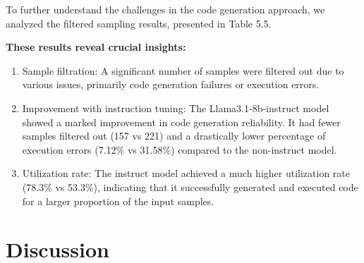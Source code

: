 \documentclass[logo,msc]{infthesis}           %
\begin{document}
To further understand the challenges in the code generation approach, we analyzed the filtered sampling results, presented in Table 5.5.


\begin{table}[h!]
\centering
\caption{Filtered sampling in Code Generation}
\label{table:metrics}
\end{table}
\textbf{These results reveal crucial insights:}
\begin{enumerate}
   
 \item Sample filtration: A significant number of samples were filtered out due to various issues, primarily code generation failures or execution errors.
 \item Improvement with instruction tuning: The Llama3.1-8b-instruct model showed a marked improvement in code generation reliability. It had fewer samples filtered out (157 vs 221) and a drastically lower percentage of execution errors (7.12\% vs 31.58\%) compared to the non-instruct model.
 \item Utilization rate: The instruct model achieved a much higher utilization rate (78.3\% vs 53.3\%), indicating that it successfully generated and executed code for a larger proportion of the input samples.
\end{enumerate}

\section{Discussion}
\end{document}
